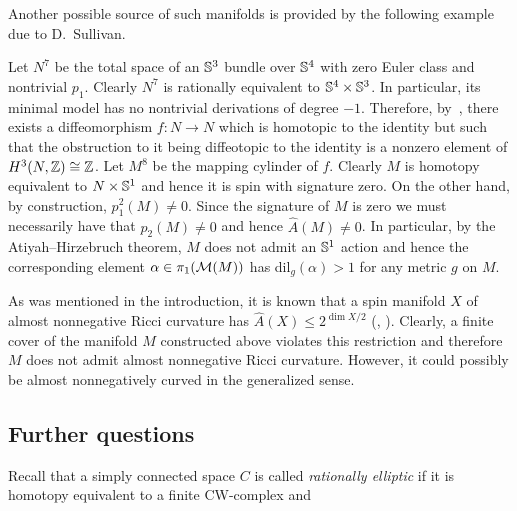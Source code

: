 \documentclass{amsart}
\begin{document}
Another possible source of such manifolds is provided by the following example due to D.~Sullivan.
\begin{ex}
Let $N^7$ be the total space of an ${\Bbb S}^3$ bundle over ${\Bbb S}^4$ with zero Euler class and nontrivial $p_1$.
Clearly $N^7$ is rationally equivalent to ${\Bbb S}^4\times {\Bbb S}^3$.
In particular, its minimal model has no nontrivial derivations of degree $-1$.
Therefore,  by~\cite[13.3]{Su}, there exists a diffeomorphism $f\colon N\to N$ which is homotopic to the identity but such that the obstruction to it being diffeotopic to the identity is a nonzero element of $H^3(N,{\Bbb Z})\cong {\Bbb Z}$.
Let $M^8$ be the mapping cylinder of $f$.
Clearly $M$ is homotopy equivalent to $N\times {\Bbb S}^{1}$ and hence it is spin with signature zero.
On the other hand, by construction, $p_1^2(M)\ne 0$.
Since the signature of $M$ is zero we must necessarily have that $p_2(M)\ne 0$  and hence $\hat{A}(M)\ne 0$.
In particular, by the Atiyah--Hirzebruch theorem, $M$ does not admit an ${\Bbb S}^{1}$ action  and hence the corresponding element $\alpha \in \pi_1({\mathcal M}(M))$ has dil$_g(\alpha)>1$ for any metric $g$ on $M$.
\end{ex}

\begin{rmk}
As was mentioned in the introduction, it is known that a spin
manifold $X$ of almost nonnegative Ricci curvature has
$\hat{A}(X)\le 2^{\dim X/2}$ (\cite[page 41]{G5}, \cite{Ga}).
Clearly, a finite cover of the manifold $M$ constructed above
violates this restriction and therefore $M$ does not admit almost
nonnegative Ricci curvature. However,  it could possibly be almost
nonnegatively curved in the generalized sense.
\end{rmk}



















\subsection{Further questions}

Recall that a simply connected space $C$ is called  \emph{rationally
elliptic} if it is homotopy equivalent to a finite CW-complex and
\end{document}

